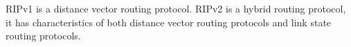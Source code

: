 RIPv1 is a distance vector routing protocol. RIPv2 is a hybrid routing protocol, it has characteristics of both distance vector routing protocols and link state routing protocols.